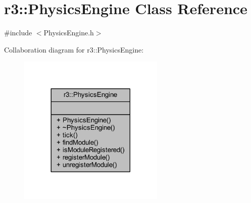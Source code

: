 \hypertarget{classr3_1_1_physics_engine}{}\section{r3\+:\+:Physics\+Engine Class Reference}
\label{classr3_1_1_physics_engine}


{\ttfamily \#include $<$Physics\+Engine.\+h$>$}



Collaboration diagram for r3\+:\+:Physics\+Engine\+:\nopagebreak
\begin{figure}[H]
\begin{center}
\leavevmode
\includegraphics[width=197pt]{classr3_1_1_physics_engine__coll__graph}
\end{center}
\end{figure}
